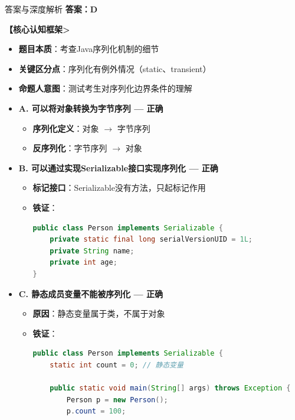 \documentclass[12pt, a4paper]{ctexart}
\begin{document}
\begin{bluebox}{答案与深度解析}
	\textbf{答案：D}

	\textbf{【核心认知框架>}
	\begin{itemize}[label={}, leftmargin=*, nosep]
		\item \textbf{题目本质}：考查Java序列化机制的细节
		\item \textbf{关键区分点}：序列化有例外情况（static、transient）
		\item \textbf{命题人意图}：测试考生对序列化边界条件的理解
	\end{itemize}

	\begin{itemize}[label={}, nosep]
		\item \textbf{A. 可以将对象转换为字节序列 — 正确}
		\begin{itemize}[label={}, leftmargin=*, nosep]
			\item \textbf{序列化定义}：对象 $\rightarrow$ 字节序列
			\item \textbf{反序列化}：字节序列 $\rightarrow$ 对象
		\end{itemize}

		\item \textbf{B. 可以通过实现Serializable接口实现序列化 — 正确}
		\begin{itemize}[label={}, leftmargin=*, nosep]
			\item \textbf{标记接口}：Serializable没有方法，只起标记作用
			\item \textbf{铁证}：
			      \begin{lstlisting}[language=Java]
public class Person implements Serializable {
    private static final long serialVersionUID = 1L;
    private String name;
    private int age;
}
      \end{lstlisting}
		\end{itemize}

		\item \textbf{C. 静态成员变量不能被序列化 — 正确}
		\begin{itemize}[label={}, leftmargin=*, nosep]
			\item \textbf{原因}：静态变量属于类，不属于对象
			\item \textbf{铁证}：
			      \begin{lstlisting}[language=Java]
public class Person implements Serializable {
    static int count = 0; // 静态变量

    public static void main(String[] args) throws Exception {
        Person p = new Person();
        p.count = 100;


\end{lstlisting}
\end{itemize}
\end{itemize}
\end{bluebox}
\end{document}
